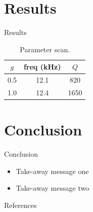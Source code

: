 \documentclass[aspectratio=169,10pt]{beamer}
\begin{document}
\section{Results}
\begin{frame}{Results}
  \begin{table}
    \centering
    \begin{tabular}{ccc}
      \toprule
      $g$ & freq (kHz) & $Q$ \\
      \midrule
      0.5 & 12.1 & 820 \\
      1.0 & 12.4 & 1650 \\
      \bottomrule
    \end{tabular}
    \caption{Parameter scan.}
  \end{table}
\end{frame}

\section{Conclusion}
\begin{frame}{Conclusion}
  \begin{itemize}
    \item Take-away message one
    \item Take-away message two
  \end{itemize}
\end{frame}

\begin{frame}[allowframebreaks]{References}
  
  
\end{frame}
\end{document}
